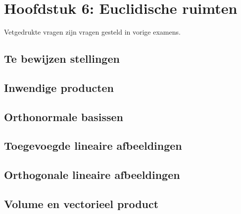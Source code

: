 \documentclass[12pt]{article}
\begin{document}
\date{}    
\maketitle
    \section*{Hoofdstuk 6: Euclidische ruimten}
    Vetgedrukte vragen zijn vragen gesteld in vorige examens.
    \setcounter{section}{6}
    \subsection*{Te bewijzen stellingen}
    \subsection{Inwendige producten}
    \subsection{Orthonormale basissen}
    \subsection{Toegevoegde lineaire afbeeldingen}
    \subsection{Orthogonale lineaire afbeeldingen}
    \subsection{Volume en vectorieel product}
\end{document}
